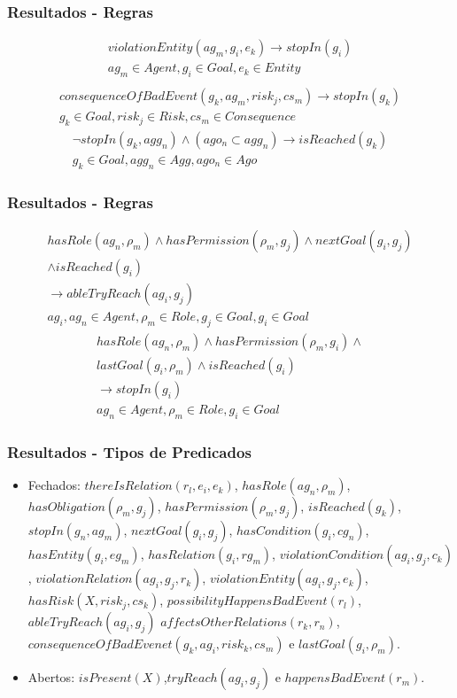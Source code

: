 \documentclass{beamer}
\begin{document}
\begin{frame}
	\frametitle{Resultados - Regras}
	\begin{eqnarray}\label{consvioent}
		violationEntity(ag_m,g_i,e_k) \to stopIn(g_i) \nonumber \\  
	    ag_m \in Agent, g_i \in Goal, e_k \in Entity \\ \nonumber
	\end{eqnarray}
	\begin{eqnarray}\label{badcons}
		consequenceOfBadEvent(g_k,ag_m,risk_j,cs_m) \to stopIn(g_k) \nonumber \\ 
	    g_k \in Goal, risk_j \in Risk, cs_m \in Consequence
	\end{eqnarray}
	\begin{eqnarray}\label{wenStop}
		\neg stopIn(g_k,agg_n) \wedge (ago_n \subset agg_n) \to isReached(g_k) \nonumber \\ 
	    g_k \in Goal, agg_n \in Agg, ago_n \in Ago 
	\end{eqnarray}
\end{frame}
\begin{frame}
	\frametitle{Resultados - Regras}
	\begin{eqnarray}\label{rolenextgoal}
		hasRole(ag_n,\rho_m) \wedge hasPermission(\rho_m,g_j) \wedge nextGoal(g_i,g_j) \nonumber \\
		\wedge isReached(g_i) \nonumber \\
		\to ableTryReach(ag_i,g_j) \nonumber \\
	    ag_i, ag_n \in Agent, \rho_m \in Role, g_j \in Goal, g_i \in Goal
	\end{eqnarray}
	\begin{eqnarray}\label{rolelastgoal}
		hasRole(ag_n,\rho_m) \wedge hasPermission(\rho_m,g_i) \wedge \nonumber \\
		lastGoal(g_i,\rho_m) \wedge isReached(g_i) \nonumber \\
		\to stopIn(g_i) \nonumber \\
	    ag_n \in Agent, \rho_m \in Role, g_i \in Goal
	\end{eqnarray}
\end{frame}
\begin{frame}
	\frametitle{Resultados - Tipos de Predicados}
	\begin{itemize}
		\item Fechados: $thereIsRelation(r_l,e_i,e_k)$, $hasRole(ag_n,\rho_m)$, $hasObligation(\rho_m,g_j)$,
		$hasPermission(\rho_m, g_j)$, $isReached(g_k)$, $stopIn(g_n, ag_m)$, $nextGoal(g_i,g_j)$, $hasCondition(g_i,cg_n)$,
		$hasEntity(g_i,eg_m)$, $hasRelation(g_i,rg_m)$, $violationCondition(ag_i,g_j,c_k) $, $ violationRelation(ag_i,g_j,r_k) $,
		$ violationEntity(ag_i,g_j,e_k) $,  $ hasRisk(X, risk_j, cs_k) $, $possibilityHappensBadEvent(r_l)$, $ableTryReach(ag_i,g_j)$ 
		$affectsOtherRelations(r_k,r_n)$, $consequenceOfBadEvenet(g_k, ag_i,risk_k,cs_m)$  e $lastGoal(g_i,\rho_m)$.
		\item Abertos: $isPresent(X)$,$tryReach(ag_i,g_j)$ e $happensBadEvent(r_m)$.
	\end{itemize}
\end{frame}
\end{document}

